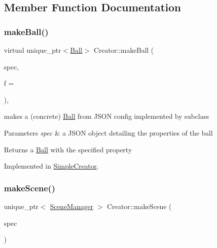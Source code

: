 \subsection{Member Function Documentation}
\mbox{\label{class_creator_aa3f6415656f52625d4f3051bfa70d4eb}} 
\subsubsection{\texorpdfstring{make\+Ball()}{makeBall()}}
{\footnotesize\ttfamily virtual unique\+\_\+ptr$<$\mbox{\hyperlink{class_ball}{Ball}}$>$ Creator\+::make\+Ball (\begin{DoxyParamCaption}\item[{const Q\+Json\+Object \&}]{spec,  }\item[{int}]{f = {} }\end{DoxyParamCaption})\hspace{0.3cm}{\ttfamily [protected]}, {}}



makes a (concrete) \mbox{\hyperlink{class_ball}{Ball}} from J\+S\+ON config implemented by subclass 


\begin{DoxyParams}{Parameters}
{\em spec} & a J\+S\+ON object detailing the properties of the ball\\
\hline
\end{DoxyParams}
\begin{DoxyReturn}{Returns}
a \mbox{\hyperlink{class_ball}{Ball}} with the specified property 
\end{DoxyReturn}


Implemented in \mbox{\hyperlink{class_simple_creator_a8e5fdfc8bcd5a661cdcfb49d33a51910}{Simple\+Creator}}.

\mbox{\label{class_creator_ae2ccbd8403068b381ad49e6c3b39891f}} 
\subsubsection{\texorpdfstring{make\+Scene()}{makeScene()}}
{\footnotesize\ttfamily unique\+\_\+ptr$<$ \mbox{\hyperlink{class_scene_manager}{Scene\+Manager}} $>$ Creator\+::make\+Scene (\begin{DoxyParamCaption}\item[{const Q\+Json\+Object \&}]{spec }\end{DoxyParamCaption})}



